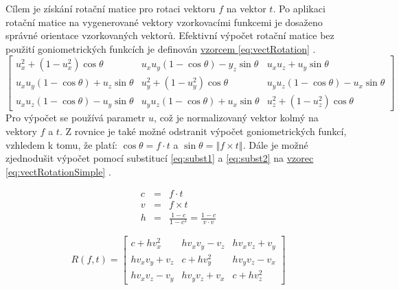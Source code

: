 \documentclass[czech,master,dept460,male,cpp,cpdeclaration]{diploma}
\newcommand{\fromVect}{f}
\newcommand{\toVect}{t}
\begin{document}
Cílem je získání rotační matice pro rotaci vektoru $\fromVect$ na vektor $\toVect$. Po aplikaci rotační matice na vygenerované vektory vzorkovacími funkcemi je dosaženo správné orientace vzorkovaných vektorů.  Efektivní výpočet rotační matice bez použití goniometrických funkcích je definován \hyperref[eq:vectRotation]{vzorcem \ref{eq:vectRotation}} \cite{MollerHughesVectRotation}.
\begin{equation} \label{eq:vectRotation}
    \begin{bmatrix}
        u_x^2 + \left ( 1 - u_x^2\right ) \cos\theta                & u_x u_y \left ( 1 - \cos \theta \right ) - y_z \sin \theta & u_x u_z + u_y \sin \theta                                  \\
        u_x u_y \left ( 1 -  \cos \theta \right ) + u_z \sin \theta & u_y^2 + \left ( 1 - u_y^2\right ) \cos\theta               & u_y u_z \left ( 1 - \cos \theta \right ) - u_x \sin \theta \\
        u_x u_z \left ( 1 - \cos \theta \right ) - u_y \sin \theta  & u_y u_z \left ( 1 - \cos \theta \right ) + u_x \sin \theta & u_z^2 + \left ( 1 - u_z^2\right ) \cos\theta
    \end{bmatrix}
\end{equation}
Pro výpočet se používá parametr $u$, což je normalizovaný vektor kolmý na vektory $\fromVect$ a $\toVect$. Z rovnice je také možné odstranit výpočet goniometrických funkcí, vzhledem k tomu, že platí: $\cos \theta = \fromVect \cdot \toVect$ a $\sin \theta = \left\Vert \fromVect \times \toVect \right\Vert$. Dále je možné zjednodušit výpočet pomocí substitucí \hyperref[eq:subst1]{\ref{eq:subst1}} a \hyperref[eq:subst2]{\ref{eq:subst2}} na \hyperref[eq:vectRotationSimple]{vzorec \ref{eq:vectRotationSimple}} \cite{MollerHughesVectRotation}.

\begin{eqnarray} \label{eq:subst1}
    c &=& \fromVect \cdot \toVect \label{eq:subst2}\\
    v &=& \fromVect \times \toVect \nonumber\\
    h &=& \frac{1 - c}{1 - c^2} = \frac{1 - c}{v \cdot v}\label{eq:subst2}
\end{eqnarray}

\begin{equation} \label{eq:vectRotationSimple}
    R\left ( \fromVect, \toVect \right) = \begin{bmatrix}
        c + h v_x^2     & h v_x v_y - v_z & h v_x v_z + v_y \\
        h v_x v_y + v_z & c + h v_y^2     & h v_y v_z - v_x \\
        h v_x v_z - v_y & h v_y v_z + v_x & c + h v_z^2
    \end{bmatrix}
\end{equation}
\end{document}

